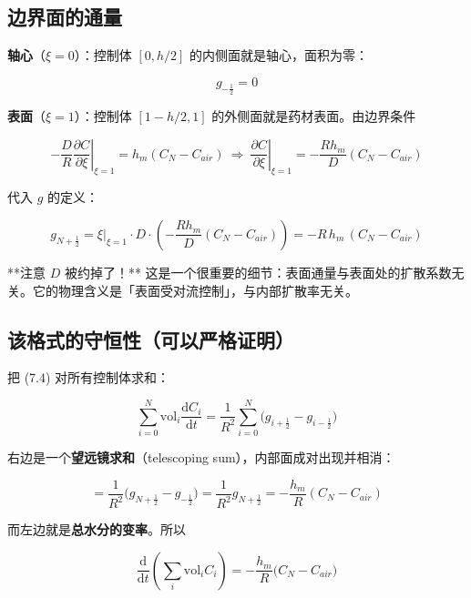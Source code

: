 \subsection{边界面的通量}


\textbf{轴心}（$\xi=0$）：控制体 $[0,h/2]$ 的内侧面就是轴心，面积为零：


\begin{equation}
g_{-\frac12}=0\tag{7.8}
\end{equation}


\textbf{表面}（$\xi=1$）：控制体 $[1-h/2,1]$ 的外侧面就是药材表面。由边界条件


\begin{equation*}
-\frac DR\left.\frac{\partial C}{\partial\xi}\right|_{\xi=1}=h_m(C_N-C_{air})
\ \Longrightarrow\ \left.\frac{\partial C}{\partial\xi}\right|_{\xi=1}=-\frac{Rh_m}{D}(C_N-C_{air})
\end{equation*}


代入 $g$ 的定义：


\begin{equation}
g_{N+\frac12}=\xi\Big|_{\xi=1}\cdot D\cdot\left(-\frac{Rh_m}{D}(C_N-C_{air})\right)=-R\,h_m\,(C_N-C_{air})\tag{7.9}
\end{equation}


**注意 $D$ 被约掉了！** 这是一个很重要的细节：表面通量与表面处的扩散系数无关。它的物理含义是「表面受对流控制」，与内部扩散率无关。


\subsection{该格式的守恒性（可以严格证明）}


把 (7.4) 对所有控制体求和：


\begin{equation*}
\sum_{i=0}^{N}\mathrm{vol}_i\frac{\mathrm{d} C_i}{\mathrm{d} t}
=\frac{1}{R^2}\sum_{i=0}^{N}\Big(g_{i+\frac12}-g_{i-\frac12}\Big)
\end{equation*}


右边是一个\textbf{望远镜求和}（telescoping sum），内部面成对出现并相消：


\begin{equation}
=\frac{1}{R^2}\Big(g_{N+\frac12}-g_{-\frac12}\Big)=\frac{1}{R^2}g_{N+\frac12}
=-\frac{h_m}{R}(C_N-C_{air})\tag{7.10}
\end{equation}


而左边就是\textbf{总水分的变率}。所以


\begin{equation*}
\boxed{\ \frac{\mathrm{d}}{\mathrm{d} t}\left(\sum_{i}\mathrm{vol}_i C_i\right)=-\frac{h_m}{R}\big(C_N-C_{air}\big)\ }
\end{equation*}


